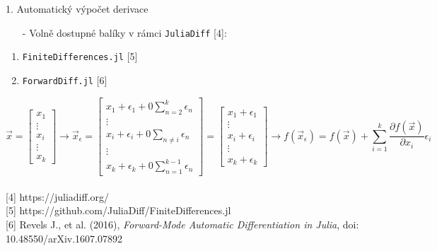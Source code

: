 \documentclass[aspectratio=169,xcolor=dvipsnames]{beamer}
\begin{document}
\begin{frame}[plain]{1. Automatický výpočet derivace}
	\begin{itemize}
		\item[-] Volně dostupné balíky v rámci \texttt{JuliaDiff} [4]:
	\end{itemize}
	\begin{enumerate}
		\item \texttt{FiniteDifferences.jl} [5]
		\item \texttt{ForwardDiff.jl} [6]
	\end{enumerate}
	\vspace{2mm}
	$$
	\vec{x}=\left[\begin{array}{c}
	x_1 \\
	\vdots \\
	x_i \\
	\vdots \\
	x_k
	\end{array}\right] \rightarrow \vec{x}_\epsilon=\left[\begin{array}{c}
	x_1+\epsilon_1+0 \sum_{n=2}^k \epsilon_n \\
	\vdots \\
	x_i+\epsilon_i+0 \sum_{n \neq i} \epsilon_n \\
	\vdots \\
	x_k+\epsilon_k+0 \sum_{n=1}^{k-1} \epsilon_n
	\end{array}\right]=\left[\begin{array}{c}
	x_1+\epsilon_1 \\
	\vdots \\
	x_i+\epsilon_i \\
	\vdots \\
	x_k+\epsilon_k
	\end{array}\right] \rightarrow f\left(\vec{x}_\epsilon\right)=f(\vec{x})+\sum_{i=1}^k \frac{\partial f(\vec{x})}{\partial x_i} \epsilon_i
	$$\\[4pt]
	\tiny{[4] https://juliadiff.org/}\\[3pt]
	\tiny{[5] https://github.com/JuliaDiff/FiniteDifferences.jl}\\[3pt]
	\tiny{[6] Revels J., et al. (2016), \textit{Forward-Mode Automatic Differentiation in Julia}, doi: 10.48550/arXiv.1607.07892}
\end{frame}
\end{document}
